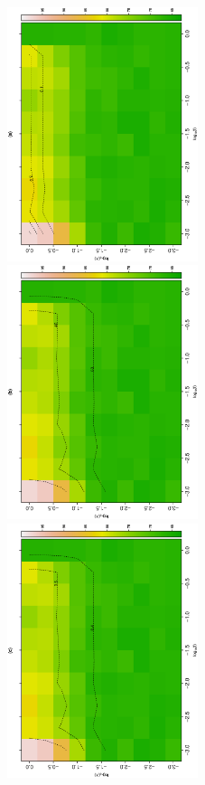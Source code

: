 \documentclass[12pt]{article}
\begin{document}
\begin{figure}[hb!]
\begin{center}

\includegraphics[width=2.2in, angle=-90]{./figures/Figure6_Mean_a_003.eps}\hspace{-0.025 in}
\includegraphics[width=2.2in, angle=-90]{./figures/Figure6_Mean_b_003.eps}\\
\includegraphics[width=2.2in, angle=-90]{./figures/Figure6_Mean_c_003.eps}\hspace{-0.025 in}

\end{center}
\end{figure}
\end{document}
